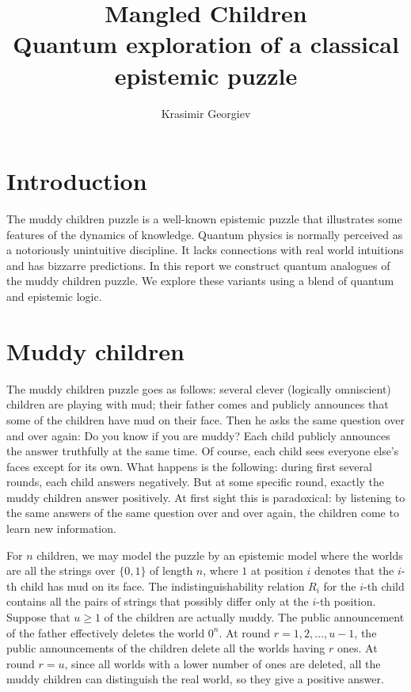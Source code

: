 \documentclass[a4paper]{article}
\title{Mangled Children \\ \large Quantum exploration of a classical epistemic
 puzzle}
\author{Krasimir Georgiev}
\begin{document}
\maketitle
\section*{Introduction} The muddy children puzzle is a well-known epistemic
puzzle that illustrates some features of the dynamics of knowledge. 
Quantum physics is normally perceived as a notoriously unintuitive
discipline. It lacks connections with real world intuitions and has bizzarre
predictions. In this report we construct quantum analogues of the muddy
children puzzle. We explore these variants using a blend of quantum and
epistemic logic.

\section*{Muddy children} The  muddy children puzzle goes as follows:
several clever (logically omniscient) children are playing with mud; their
father comes and publicly announces that some of the children have mud on
their face. Then he asks the same question over and over again: Do you know if
you are muddy? Each child publicly announces the answer truthfully at the same
time. Of course, each child sees everyone else's faces except for its own. What
happens is the following: during first several rounds, each child answers
negatively. But at some specific round, exactly the muddy children answer
positively. At first sight this is paradoxical: by listening to the same answers
of the same question over and over again, the children come to learn new
information.

For $n$ children, we may model the puzzle by an epistemic model where the worlds
are all the strings over $\{0, 1\}$ of length $n$, where $1$ at position $i$
denotes that the $i$-th child has mud on its face.
The indistinguishability relation $R_i$ for the $i$-th child contains all the
pairs of strings that possibly differ only at the $i$-th position.
Suppose that $u \geq 1$ of the children are actually muddy. The public
announcement of the father effectively deletes the world $0^n$. At round $r = 1,
2, \dots, u-1$, the public announcements of the children delete all the worlds
having $r$ ones.  At round $r = u$, since all worlds with a lower number of ones
are deleted, all the muddy children can distinguish the real world, so they give
a positive answer.
\end{document}
